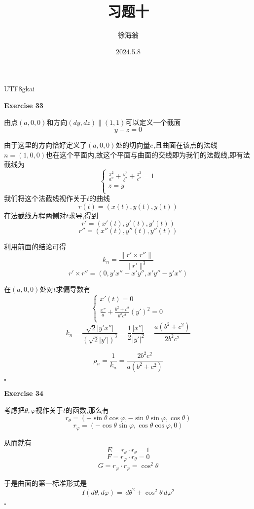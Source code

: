 \documentclass[11pt,hyperref,a4paper,UTF8]{ctexart}
\title{习题十}
\author{徐海翁}
\date{2024.5.8}
\newenvironment{exercise}[1]{%
{\textbf{Exercise #1} \\ 
    }
}{
  \hfill $\square$ 
  \par\bigskip 
}
\begin{document}
\begin{CJK}{UTF8}{gkai}

\maketitle
\begin{exercise}{33}
    由点$(a,0,0)$和方向$(dy,dz) \parallel (1,1)$可以定义一个截面
    \[y - z = 0\]

    由于这里的方向恰好定义了$(a,0,0)$处的切向量$e$,且曲面在该点的法线$n = (1,0,0)$也在这个平面内,故这个平面与曲面的交线即为我们的法截线,即有法截线为
    \[
    \begin{cases}
        \frac{x^2}{a^2} + \frac{y^2}{b^2} + \frac{z^2}{c^2}= 1\\
        z = y\\
    \end{cases}    
\]
    我们将这个法截线视作关于$t$的曲线
    \[r(t) = (x(t),y(t),y(t))\]
    在法截线方程两侧对$t$求导,得到
    \[r' = (x'(t),y'(t),y'(t))\]
    \[r'' = (x''(t),y''(t),y''(t))\]

    利用前面的结论可得
    \[k_n = \frac{\|r' \times r''\|}{\|r'\|^3}\]
    \[r' \times r'' = (0,y' x'' - x' y'' ,x' y'' - y' x'')\]

    在$(a,0,0)$处对$t$求偏导数有
    \[
    \begin{cases}
        x'(t) = 0\\
        \frac{x''}{a} + \frac{b^2 + c^2}{b^2 c^2}(y')^2 = 0\\
    \end{cases}    
    \]
    \[k_n = \frac{\sqrt{2} |y' x''|}{(\sqrt{2}|y'|)^3} = \frac{1}{2} \frac{|x''|}{|y'|^2} = \frac{a(b^2 + c^2)}{2b^2 c^2}\]

    \[\rho_n = \frac{1}{k_n} = \frac{2b^2 c^2}{a(b^2 + c^2)}\]
\end{exercise}

\begin{exercise}{34}
    考虑把$\theta,\varphi$视作关于$t$的函数,那么有
    \[r_\theta = (- \sin \theta \cos \varphi, - \sin \theta \sin \varphi, \cos \theta)\]
    \[r_\varphi = (- \cos \theta \sin \varphi, \cos \theta \cos \varphi,0)\]

    从而就有
    \[E = r_\theta \cdot r_\theta = 1\]
    \[F = r_\varphi \cdot r_\theta = 0\]
    \[G = r_\varphi \cdot r_\varphi = \cos^2 \theta\]

    于是曲面的第一标准形式是
    \[I(d\theta,d\varphi) =  \,d\theta^2 +\cos^2 \theta \, d \varphi^2\]


\end{exercise}
\end{CJK}
\end{document}
